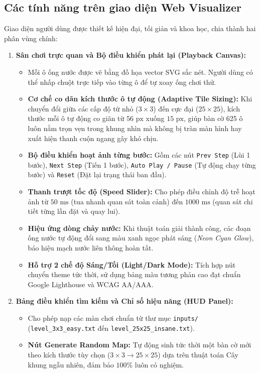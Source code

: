 \documentclass[a4paper]{article}
\begin{document}
\subsection{Các tính năng trên giao diện Web Visualizer}
Giao diện người dùng được thiết kế hiện đại, tối giản và khoa học, chia thành hai phân vùng chính:
\begin{enumerate}
    \item \textbf{Sân chơi trực quan và Bộ điều khiển phát lại (Playback Canvas):}
    \begin{itemize}
        \item Mỗi ô ống nước được vẽ bằng đồ họa vector SVG sắc nét. Người dùng có thể nhấp chuột trực tiếp vào từng ô để tự xoay ống chơi thử.
        \item \textbf{Cơ chế co dãn kích thước ô tự động (Adaptive Tile Sizing):} Khi chuyển đổi giữa các cấp độ từ nhỏ ($3 \times 3$) đến cực đại ($25 \times 25$), kích thước mỗi ô tự động co giãn từ $56\text{ px}$ xuống $15\text{ px}$, giúp bàn cờ 625 ô luôn nằm trọn vẹn trong khung nhìn mà không bị tràn màn hình hay xuất hiện thanh cuộn ngang gây khó chịu.
        \item \textbf{Bộ điều khiển hoạt ảnh từng bước:} Gồm các nút \texttt{Prev Step} (Lùi 1 bước), \texttt{Next Step} (Tiến 1 bước), \texttt{Auto Play / Pause} (Tự động chạy từng bước) và \texttt{Reset} (Đặt lại trạng thái ban đầu).
        \item \textbf{Thanh trượt tốc độ (Speed Slider):} Cho phép điều chỉnh độ trễ hoạt ảnh từ $50\text{ ms}$ (tua nhanh quan sát toàn cảnh) đến $1000\text{ ms}$ (quan sát chi tiết từng lần đặt và quay lui).
        \item \textbf{Hiệu ứng dòng chảy nước:} Khi thuật toán giải thành công, các đoạn ống nước tự động đổi sang màu xanh ngọc phát sáng (\textit{Neon Cyan Glow}), báo hiệu mạch nước liên thông hoàn tất.
        \item \textbf{Hỗ trợ 2 chế độ Sáng/Tối (Light/Dark Mode):} Tích hợp nút chuyển theme tức thời, sử dụng bảng màu tương phản cao đạt chuẩn Google Lighthouse và WCAG AA/AAA.
    \end{itemize}
    \item \textbf{Bảng điều khiển tìm kiếm và Chỉ số hiệu năng (HUD Panel):}
    \begin{itemize}
        \item Cho phép nạp các màn chơi chuẩn từ thư mục \texttt{inputs/} (\texttt{level\_3x3\_easy.txt} đến \texttt{level\_25x25\_insane.txt}).
        \item \textbf{Nút Generate Random Map:} Tự động sinh tức thời một bàn cờ mới theo kích thước tùy chọn ($3 \times 3 \to 25 \times 25$) dựa trên thuật toán Cây khung ngẫu nhiên, đảm bảo $100\%$ luôn có nghiệm.

\end{itemize}
\end{enumerate}
\end{document}

